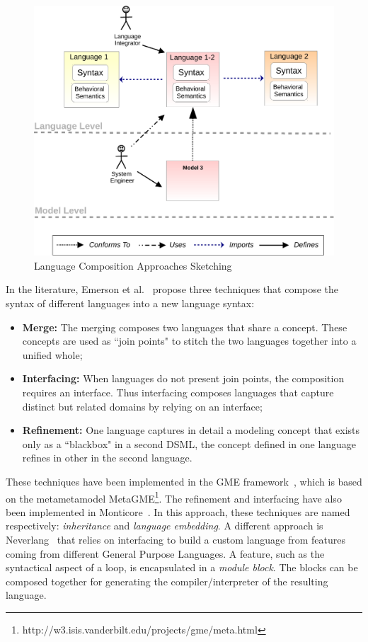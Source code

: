 \begin{figure}
	\begin{center}
		\includegraphics[width=.7\textwidth]{background/figs/langcompo}
		\caption{Language Composition Approaches Sketching}
		\label{fig:langcompo}
	\end{center}
\end{figure}

In the literature, Emerson et al.~\cite{metamodelcompo} propose three techniques that compose the syntax of different languages into a new language syntax:
\begin{itemize}
	\item \textbf{Merge:} The merging composes two languages that share a concept. These concepts are used as ``join points" to stitch the two languages together into a unified whole;
	\item \textbf{Interfacing:} When languages do not present join points, the composition requires an interface. Thus interfacing composes languages that capture distinct but related domains by relying on an interface;
	\item \textbf{Refinement:} One language captures in detail a modeling concept that exists only as a ``blackbox" in a second DSML, \ie the concept defined in one language refines in other in the second language.
\end{itemize}
These techniques have been implemented in the GME framework~\cite{metamodelcompo}, which is based on the metametamodel MetaGME\footnote{http://w3.isis.vanderbilt.edu/projects/gme/meta.html}. The refinement and interfacing have also been implemented in Monticore~\cite{monticore}. In this approach, these techniques are named respectively: \emph{inheritance} and \emph{language embedding}. A different approach is Neverlang~\cite{neverlang} that relies on interfacing to build a custom language from features coming from different General Purpose Languages. A feature, such as the syntactical aspect of a loop, is encapsulated in a \emph{module block}. The blocks can be composed together for generating the compiler/interpreter of the resulting language. 

